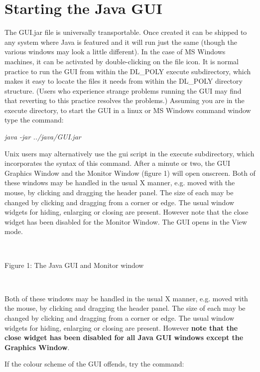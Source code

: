 \section{Starting the Java GUI}

The GUI.jar file is universally transportable. Once created it can be shipped
to any system where Java is featured and it will run just the same (though the
various windows may look a little different). In the case of MS Windows
machines, it can be activated by double-clicking on the file icon. It is
normal practice to run the GUI from within the DL\_POLY execute subdirectory,
which makes it easy to locate the files it needs from within the DL\_POLY
directory structure. (Users who experience strange problems running the GUI
may find that reverting to this practice resolves the problems.) Assuming you
are in the execute directory, to start the GUI in a linux or MS Windows
command window type the command:

\vspace{0.25cm}
{\em java -jar ../java/GUI.jar}
\vspace{0.25cm}

\noindent
Unix users may alternatively use the gui script in the execute subdirectory,
which incorporates the syntax of this command. After a minute or two, the GUI
Graphics Window and the Monitor Window (figure 1) will open onscreen. Both of
these windows may be handled in the usual X manner, e.g. moved with the mouse,
by clicking and dragging the header panel. The size of each may be changed by
clicking and dragging from a corner or edge. The usual window widgets for
hiding, enlarging or closing are present. However note that the close widget
has been disabled for the Monitor Window. The GUI opens in the View mode.

~

\vskip 5mm
\centerline{}
\centerline{Figure 1: The Java GUI and Monitor window}
\vskip 5mm

~

\noindent
Both of these windows may be handled in the usual X manner, e.g. moved
with the mouse, by clicking and dragging the header panel. The size of
each may be changed by clicking and dragging from a corner or
edge. The usual window widgets for hiding, enlarging or closing are
present. However {\bf note that the close widget has been disabled for
all Java GUI windows except the Graphics Window}.

If the colour scheme of the GUI offends, try the command:

